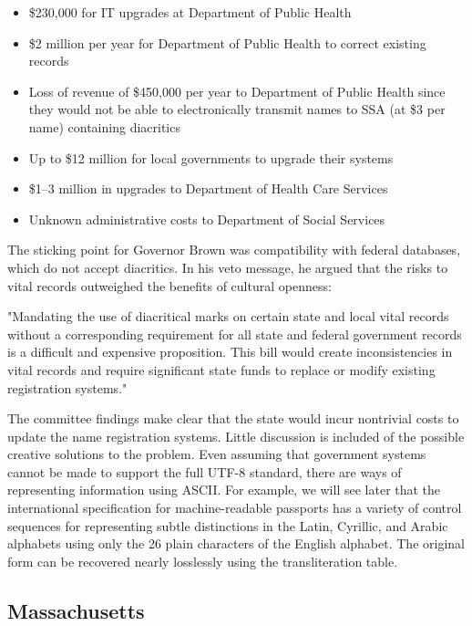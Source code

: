 \begin{itemize}

\item \$230,000 for IT upgrades at Department of Public Health
\item \$2 million per year for Department of Public Health to correct existing
records
\item Loss of revenue of \$450,000 per year to Department of Public Health since
they would not be able to electronically transmit names to SSA (at \$3 per name)
containing diacritics
\item Up to \$12 million for local governments to upgrade their systems
\item \$1--3 million in upgrades to Department of Health Care Services
\item Unknown administrative costs to Department of Social Services

\end{itemize}

The sticking point for Governor Brown was compatibility with federal databases,
which do not accept diacritics. In his veto message, he argued that the risks to
vital records outweighed the benefits of cultural openness:

"Mandating the use of diacritical marks on certain state and local vital records
without a corresponding requirement for all state and federal government records
is a difficult and expensive proposition. This bill would create
inconsistencies in vital records and require significant state funds to replace
or modify existing registration systems."

The committee findings make clear that the state would incur nontrivial costs to
update the name registration systems. Little discussion is included of the
possible creative solutions to the problem. Even assuming that government
systems cannot be made to support the full UTF-8 standard, there are ways of
representing information using ASCII. For example, we will see later that the
international specification for machine-readable passports has a variety of
control sequences for representing subtle distinctions in the Latin, Cyrillic,
and Arabic alphabets using only the 26 plain characters of the English alphabet.
The original form can be recovered nearly losslessly using the transliteration
table.

\subsection{Massachusetts}

